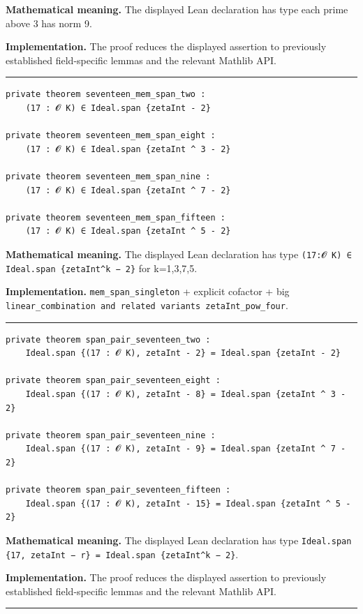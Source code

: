 \documentclass[UTF8,a4paper,11pt,fontset=fandol]{ctexart}
\theoremstyle{definition}
\newcommand{\statementsep}{\par\medskip\hrule\medskip}
\begin{document}
\noindent\textbf{Mathematical meaning.} The displayed Lean declaration has type each prime above 3 has norm 9.\par
\noindent\textbf{Implementation.} The proof reduces the displayed assertion to previously established field-specific lemmas and the relevant Mathlib API.\par
\statementsep
\begin{verbatim}
private theorem seventeen_mem_span_two :
    (17 : 𝓞 K) ∈ Ideal.span {zetaInt - 2}

private theorem seventeen_mem_span_eight :
    (17 : 𝓞 K) ∈ Ideal.span {zetaInt ^ 3 - 2}

private theorem seventeen_mem_span_nine :
    (17 : 𝓞 K) ∈ Ideal.span {zetaInt ^ 7 - 2}

private theorem seventeen_mem_span_fifteen :
    (17 : 𝓞 K) ∈ Ideal.span {zetaInt ^ 5 - 2}
\end{verbatim}
\noindent\textbf{Mathematical meaning.} The displayed Lean declaration has type \texttt{(17:𝓞 K) ∈ Ideal.\allowbreak{}span \{zetaInt\textasciicircum{}k − 2\}} for k=1,3,7,5.\par
\noindent\textbf{Implementation.} \texttt{mem\_\allowbreak{}span\_\allowbreak{}singleton} + explicit cofactor + big \texttt{linear\_\allowbreak{}combination and related variants zetaInt\_\allowbreak{}pow\_\allowbreak{}four}.\par
\statementsep
\begin{verbatim}
private theorem span_pair_seventeen_two :
    Ideal.span {(17 : 𝓞 K), zetaInt - 2} = Ideal.span {zetaInt - 2}

private theorem span_pair_seventeen_eight :
    Ideal.span {(17 : 𝓞 K), zetaInt - 8} = Ideal.span {zetaInt ^ 3 - 2}

private theorem span_pair_seventeen_nine :
    Ideal.span {(17 : 𝓞 K), zetaInt - 9} = Ideal.span {zetaInt ^ 7 - 2}

private theorem span_pair_seventeen_fifteen :
    Ideal.span {(17 : 𝓞 K), zetaInt - 15} = Ideal.span {zetaInt ^ 5 - 2}
\end{verbatim}
\noindent\textbf{Mathematical meaning.} The displayed Lean declaration has type \texttt{Ideal.\allowbreak{}span \{17, zetaInt − r\} = Ideal.\allowbreak{}span \{zetaInt\textasciicircum{}k − 2\}}.\par
\noindent\textbf{Implementation.} The proof reduces the displayed assertion to previously established field-specific lemmas and the relevant Mathlib API.\par
\statementsep
\end{document}
